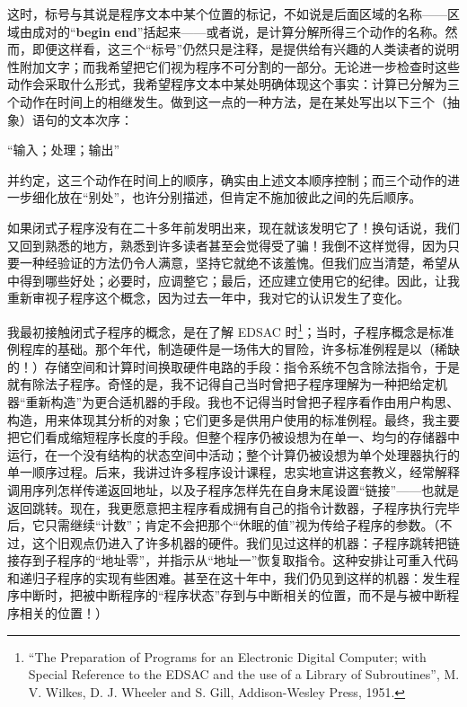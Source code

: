 \noindent
这时，标号与其说是程序文本中某个位置的标记，不如说是后面区域的名称——区域由成对的“\textbf{begin} \textendash  \textbf{end}”括起来——或者说，是计算分解所得三个动作的名称。然而，即便这样看，这三个“标号”仍然只是注释，是提供给有兴趣的人类读者的说明性附加文字；而我希望把它们视为程序不可分割的一部分。无论进一步检查时这些动作会采取什么形式，我希望程序文本中某处明确体现这个事实：计算已分解为三个动作在时间上的相继发生。做到这一点的一种方法，是在某处写出以下三个（抽象）语句的文本次序：
\medskip

{
	\setlength{\parindent}{8em}
	\hspace{-.4em}``输入；处理；输出''
}
\medskip

\noindent
并约定，这三个动作在时间上的顺序，确实由上述文本顺序控制；而三个动作的进一步细化放在“别处”，也许分别描述，但肯定不施加彼此之间的先后顺序。

如果闭式子程序没有在二十多年前发明出来，现在就该发明它了！换句话说，我们又回到熟悉的地方，熟悉到许多读者甚至会觉得受了骗！我倒不这样觉得，因为只要一种经验证的方法仍令人满意，坚持它就绝不该羞愧。但我们应当清楚，希望从中得到哪些好处；必要时，应调整它；最后，还应建立使用它的纪律。因此，让我重新审视子程序这个概念，因为过去一年中，我对它的认识发生了变化。

我最初接触闭式子程序的概念，是在了解 EDSAC 时\footnote{``The Preparation of Programs for an Electronic Digital Computer; with Special Reference to the EDSAC and the use of a Library of Subroutines'', M. V. Wilkes, D. J. Wheeler and S. Gill, Addison-Wesley Press, 1951.}；当时，子程序概念是标准例程库的基础。那个年代，制造硬件是一场伟大的冒险，许多标准例程是以（稀缺的！）存储空间和计算时间换取硬件电路的手段：指令系统不包含除法指令，于是就有除法子程序。奇怪的是，我不记得自己当时曾把子程序理解为一种把给定机器“重新构造”为更合适机器的手段。我也不记得当时曾把子程序看作由用户构思、构造，用来体现其分析的对象；它们更多是供用户使用的标准例程。最终，我主要把它们看成缩短程序长度的手段。但整个程序仍被设想为在单一、均匀的存储器中运行，在一个没有结构的状态空间中活动；整个计算仍被设想为单个处理器执行的单一顺序过程。后来，我讲过许多程序设计课程，忠实地宣讲这套教义，经常解释调用序列怎样传递返回地址，以及子程序怎样先在自身末尾设置“链接”——也就是返回跳转。现在，我更愿意把主程序看成拥有自己的指令计数器，子程序执行完毕后，它只需继续“计数”；肯定不会把那个“休眠的值”视为传给子程序的参数。（不过，这个旧观点仍进入了许多机器的硬件。我们见过这样的机器：子程序跳转把链接存到子程序的“地址零”，并指示从“地址一”恢复取指令。这种安排让可重入代码和递归子程序的实现有些困难。甚至在这十年中，我们仍见到这样的机器：发生程序中断时，把被中断程序的“程序状态”存到与中断相关的位置，而不是与被中断程序相关的位置！）

